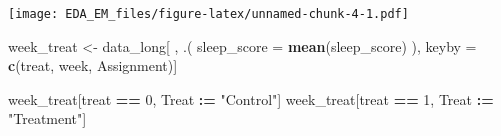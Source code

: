 \documentclass[
]{article}
\newenvironment{Shaded}{\begin{snugshade}}{\end{snugshade}}
\newcommand{\AttributeTok}[1]{\textcolor[rgb]{0.13,0.29,0.53}{#1}}
\newcommand{\DecValTok}[1]{\textcolor[rgb]{0.00,0.00,0.81}{#1}}
\newcommand{\FunctionTok}[1]{\textcolor[rgb]{0.13,0.29,0.53}{\textbf{#1}}}
\newcommand{\NormalTok}[1]{#1}
\newcommand{\OtherTok}[1]{\textcolor[rgb]{0.56,0.35,0.01}{#1}}
\newcommand{\SpecialCharTok}[1]{\textcolor[rgb]{0.81,0.36,0.00}{\textbf{#1}}}
\newcommand{\StringTok}[1]{\textcolor[rgb]{0.31,0.60,0.02}{#1}}
\begin{document}
\texttt{[image: EDA\_EM\_files/figure-latex/unnamed-chunk-4-1.pdf]}

\begin{Shaded}
\begin{Highlighting}[]
\NormalTok{week\_treat }\OtherTok{\textless{}{-}}\NormalTok{ data\_long[ , .(}
  \AttributeTok{sleep\_score =} \FunctionTok{mean}\NormalTok{(sleep\_score)}
\NormalTok{  ),}
\NormalTok{  keyby }\OtherTok{=} \FunctionTok{c}\NormalTok{(}\StringTok{\textquotesingle{}treat\textquotesingle{}}\NormalTok{, }\StringTok{\textquotesingle{}week\textquotesingle{}}\NormalTok{, }\StringTok{\textquotesingle{}Assignment\textquotesingle{}}\NormalTok{)]}

\NormalTok{week\_treat[treat }\SpecialCharTok{==} \DecValTok{0}\NormalTok{, Treat }\SpecialCharTok{:=} \StringTok{"Control"}\NormalTok{]}
\NormalTok{week\_treat[treat }\SpecialCharTok{==} \DecValTok{1}\NormalTok{, Treat }\SpecialCharTok{:=} \StringTok{"Treatment"}\NormalTok{]}


\end{Highlighting}
\end{Shaded}
\end{document}

